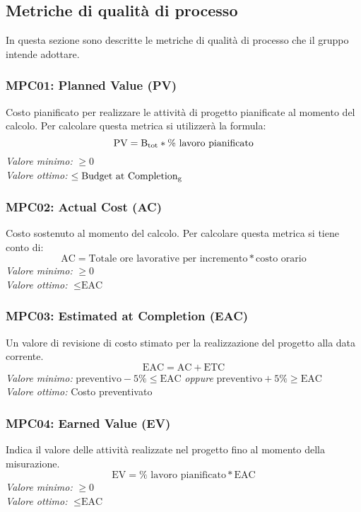 \subsection{Metriche di qualità di processo}
In questa sezione sono descritte le metriche di qualità di processo che il gruppo intende adottare.

\subsubsection{MPC01: Planned Value (PV)}
Costo pianificato per realizzare le attività di progetto pianificate al momento del calcolo.
Per calcolare questa metrica si utilizzerà la formula:
\begin{equation*}
\text{PV}=\text{B}\textsubscript{tot}*\%\text{ lavoro pianificato}
\end{equation*}
\textit{Valore minimo:} $\ge 0$\\
\textit{Valore ottimo:}	$\le \text{Budget at Completion\textsubscript{g}}$
\subsubsection{MPC02: Actual Cost (AC)}
Costo sostenuto al momento del calcolo.
Per calcolare questa metrica si tiene conto di:
\begin{equation*}
\text{AC}=\text{Totale ore lavorative per incremento}*\text{costo orario}
\end{equation*}
\textit{Valore minimo:} $\ge 0$\\
\textit{Valore ottimo:} $\le \text{EAC}$
\subsubsection{MPC03: Estimated at Completion (EAC)}
Un valore di revisione di costo stimato per la realizzazione del progetto alla data corrente.
\begin{equation*}
\text{EAC}=\text{AC}+\text{ETC}
\end{equation*}
\textit{Valore minimo:} 
$\text{preventivo} -5\% \le \text{EAC}$ \textit{oppure} $\text{preventivo} +5\% \ge \text{EAC}$\\
\textit{Valore ottimo:} Costo preventivato
\subsubsection{MPC04: Earned Value (EV)}
Indica il valore delle attività realizzate nel progetto fino al momento della misurazione.
\begin{equation*}
\text{EV}=\%\text{ lavoro pianificato}*\text{EAC}
\end{equation*}
\textit{Valore minimo:} $\ge 0$\\
\textit{Valore ottimo:} $\le \text{EAC}$
